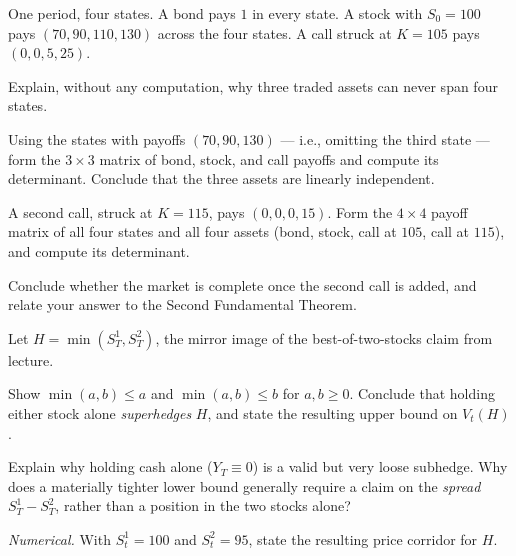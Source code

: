 \begin{exercise}
One period, four states. A bond pays \(1\) in every state. A stock with
\(S_0=100\) pays \((70,90,110,130)\) across the four states. A call struck at
\(K=105\) pays \((0,0,5,25)\).
\begin{exparts}
  \item Explain, without any computation, why three traded assets can never
  span four states.
  \item Using the states with payoffs \((70,90,130)\) --- i.e., omitting the
  third state --- form the \(3\times3\) matrix of bond, stock, and call
  payoffs and compute its determinant. Conclude that the three assets are
  linearly independent.
  \item A second call, struck at \(K=115\), pays \((0,0,0,15)\). Form the
  \(4\times4\) payoff matrix of all four states and all four assets
  (bond, stock, call at \(105\), call at \(115\)), and compute its
  determinant.
  \item Conclude whether the market is complete once the second call is
  added, and relate your answer to the Second Fundamental Theorem.
\end{exparts}
\end{exercise}

\begin{exercise}
Let \(H=\min(S_T^1,S_T^2)\), the mirror image of the best-of-two-stocks claim
from lecture.
\begin{exparts}
  \item Show \(\min(a,b)\leq a\) and \(\min(a,b)\leq b\) for \(a,b\geq0\).
  Conclude that holding either stock alone \emph{superhedges} \(H\), and
  state the resulting upper bound on \(V_t(H)\).
  \item Explain why holding cash alone (\(Y_T\equiv0\)) is a valid but very
  loose subhedge. Why does a materially tighter lower bound generally
  require a claim on the \emph{spread} \(S_T^1-S_T^2\), rather than a
  position in the two stocks alone?
  \item \emph{Numerical.} With \(S_t^1=100\) and \(S_t^2=95\), state the
  resulting price corridor for \(H\).
\end{exparts}
\end{exercise}

